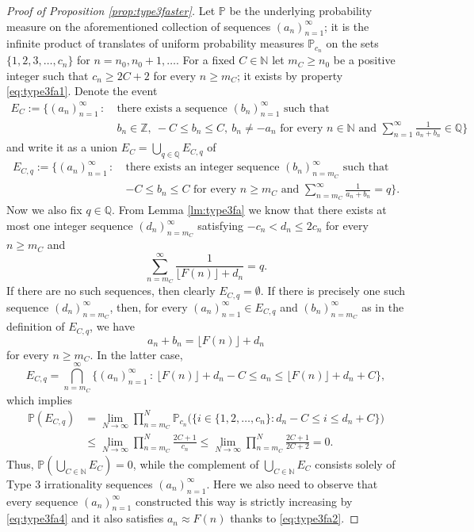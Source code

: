 \documentclass[11pt,letterpaper,reqno]{amsart}
\numberwithin{equation}{section}
\theoremstyle{definition}
\numberwithin{equation}{section}
\begin{document}
\begin{proof}[Proof of Proposition \ref{prop:type3faster}]
Let $\mathbb{P}$ be the underlying probability measure on the aforementioned collection of sequences $(a_n)_{n=1}^{\infty}$; it is the infinite product of translates of uniform probability measures $\mathbb{P}_{c_n}$ on the sets $\{1,2,3,\ldots,c_n\}$ for $n=n_0,n_0+1,\ldots$.
For a fixed $C\in\mathbb{N}$ let $m_C\geqslant n_0$ be a positive integer such that $c_n \geqslant 2C+2$ for every $n\geqslant m_C$; it exists by property \eqref{eq:type3fa1}.
Denote the event
\begin{align*}
E_C := \Big\{ (a_n)_{n=1}^{\infty} \,:\ & \text{there exists a sequence } (b_n)_{n=1}^{\infty} \text{ such that } \\
& b_n\in\mathbb{Z}, \ -C\leqslant b_n \leqslant C, \ b_n\neq -a_n \text{ for every } n\in\mathbb{N} \text{ and } \sum_{n=1}^{\infty} \frac{1}{a_n+b_n} \in \mathbb{Q} \Big\}
\end{align*}
and write it as a union $E_C = \bigcup_{q\in\mathbb{Q}} E_{C,q}$ of
\begin{align*}
E_{C,q} := \Big\{ (a_n)_{n=1}^{\infty} \,:\ & \text{there exists an integer sequence } (b_n)_{n=m_C}^{\infty} \text{ such that } \\
& -C\leqslant b_n \leqslant C \text{ for every } n\geqslant m_C \text{ and } \sum_{n=m_C}^{\infty} \frac{1}{a_n+b_n} = q \Big\}.
\end{align*}
Now we also fix $q\in\mathbb{Q}$.
From Lemma \ref{lm:type3fa} we know that there exists at most one integer sequence $(d_n)_{n=m_C}^{\infty}$ satisfying $-c_n< d_n\leqslant 2c_n$ for every $n\geqslant m_C$ and
\[ \sum_{n=m_C}^{\infty} \frac{1}{\lfloor F(n)\rfloor + d_n} = q. \]
If there are no such sequences, then clearly $E_{C,q}=\emptyset$.
If there is precisely one such sequence $(d_n)_{n=m_C}^{\infty}$, then, for every $(a_n)_{n=1}^{\infty}\in E_{C,q}$ and $(b_n)_{n=m_C}^{\infty}$ as in the definition of $E_{C,q}$, we have
\[ a_n+b_n = \lfloor F(n)\rfloor + d_n \]
for every $n\geqslant m_C$.
In the latter case,
\[ E_{C,q} = \bigcap_{n=m_C}^{\infty} \big\{ (a_n)_{n=1}^{\infty} \,:\, \lfloor F(n)\rfloor + d_n - C \leqslant a_n \leqslant \lfloor F(n)\rfloor + d_n + C \big\}, \]
which implies
\begin{align*}
\mathbb{P}(E_{C,q}) & = \lim_{N\to\infty} \prod_{n=m_C}^{N} \mathbb{P}_{c_n}\big(\big\{ i\in\{1,2,\ldots,c_n\} : d_n - C \leqslant i \leqslant d_n + C \big\}\big) \\
& \leqslant \lim_{N\to\infty} \prod_{n=m_C}^{N} \frac{2C+1}{c_n} \leqslant \lim_{N\to\infty} \prod_{n=m_C}^{N} \frac{2C+1}{2C+2} = 0.
\end{align*}
Thus, $\mathbb{P}(\bigcup_{C\in\mathbb{N}}E_{C})=0$, while the complement of $\bigcup_{C\in\mathbb{N}}E_{C}$ consists solely of Type 3 irrationality sequences $(a_n)_{n=1}^{\infty}$.
Here we also need to observe that every sequence $(a_n)_{n=1}^{\infty}$ constructed this way is strictly increasing by \eqref{eq:type3fa4} and it also satisfies $a_n\approx F(n)$ thanks to \eqref{eq:type3fa2}.
\end{proof}
\end{document}
